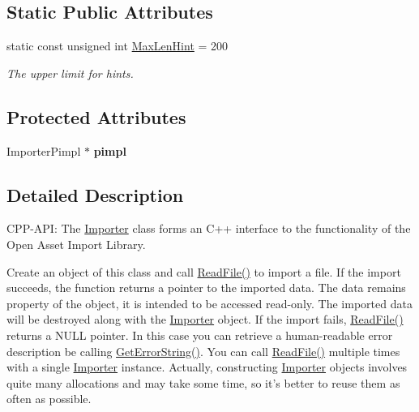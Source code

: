 \subsection*{Static Public Attributes}
\begin{DoxyCompactItemize}
\item 
\hypertarget{class_assimp_1_1_importer_a3affe8f98fc9a3b75fc3cb4c4415b37c}{static const unsigned int \hyperlink{class_assimp_1_1_importer_a3affe8f98fc9a3b75fc3cb4c4415b37c}{Max\-Len\-Hint} = 200}\label{class_assimp_1_1_importer_a3affe8f98fc9a3b75fc3cb4c4415b37c}

\begin{DoxyCompactList}\small\item\em The upper limit for hints. \end{DoxyCompactList}\end{DoxyCompactItemize}
\subsection*{Protected Attributes}
\begin{DoxyCompactItemize}
\item 
\hypertarget{class_assimp_1_1_importer_a3928bb8d375fd676dd5dbe33382e46ce}{Importer\-Pimpl $\ast$ {\bfseries pimpl}}\label{class_assimp_1_1_importer_a3928bb8d375fd676dd5dbe33382e46ce}

\end{DoxyCompactItemize}


\subsection{Detailed Description}
C\-P\-P-\/\-A\-P\-I\-: The \hyperlink{class_assimp_1_1_importer}{Importer} class forms an C++ interface to the functionality of the Open Asset Import Library.

Create an object of this class and call \hyperlink{class_assimp_1_1_importer_a174418ab41d5b8bc51a044895cb991e5}{Read\-File()} to import a file. If the import succeeds, the function returns a pointer to the imported data. The data remains property of the object, it is intended to be accessed read-\/only. The imported data will be destroyed along with the \hyperlink{class_assimp_1_1_importer}{Importer} object. If the import fails, \hyperlink{class_assimp_1_1_importer_a174418ab41d5b8bc51a044895cb991e5}{Read\-File()} returns a N\-U\-L\-L pointer. In this case you can retrieve a human-\/readable error description be calling \hyperlink{class_assimp_1_1_importer_a23bab5ba8cb9b6886c690a610766668b}{Get\-Error\-String()}. You can call \hyperlink{class_assimp_1_1_importer_a174418ab41d5b8bc51a044895cb991e5}{Read\-File()} multiple times with a single \hyperlink{class_assimp_1_1_importer}{Importer} instance. Actually, constructing \hyperlink{class_assimp_1_1_importer}{Importer} objects involves quite many allocations and may take some time, so it's better to reuse them as often as possible.

